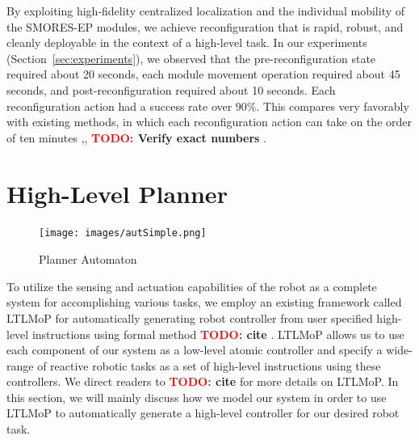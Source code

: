 \documentclass[conference]{IEEEtran}
\newcommand{\TODO}[1]{ {\bf \textcolor{red}{TODO:} #1 }}
\begin{document}
By exploiting high-fidelity centralized localization and the individual mobility of the SMORES-EP modules, we achieve reconfiguration that is rapid, robust, and cleanly deployable in the context of a high-level task.  In our experiments (Section~\ref{sec:experiments}), we observed that the pre-reconfiguration state required about 20 seconds, each module movement operation required about 45 seconds, and post-reconfiguration required about 10 seconds.  Each reconfiguration action had a success rate over 90\%.  This compares very favorably with existing methods, in which each reconfiguration action can take on the order of ten minutes \cite{Yim2007},\cite{Murata2006},\cite{Rubenstein2004}\TODO{Verify exact numbers}.

\section{High-Level Planner}
\label{sec:high-level}
%
\begin{figure}
\begin{center}
\texttt{[image: images/autSimple.png]}
\caption{Planner Automaton}
\label{fig:automaton}
\end{center}
\end{figure}

To utilize the sensing and actuation capabilities of the robot as a complete system for accomplishing various tasks, we employ an existing framework called LTLMoP for automatically generating robot controller from user specified high-level instructions using formal method \TODO{cite}.
LTLMoP allows us to use each component of our system as a low-level atomic controller and specify a wide-range of reactive robotic tasks as a set of high-level instructions using these controllers.
We direct readers to \TODO{cite} for more details on LTLMoP.
In this section, we will mainly discuss how we model our system in order to use LTLMoP to automatically generate a high-level controller for our desired robot task.
\end{document}
